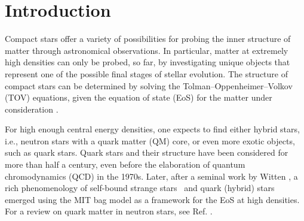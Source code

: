 \documentclass[universe,article,accept,moreauthors,pdftex]{Definitions/mdpi}
\begin{document}

\section{Introduction}
	\label{sec:introduction}

Compact stars offer a variety of possibilities for probing the inner structure of matter through astronomical observations. In particular, matter at extremely high densities can only be probed, so far, by investigating unique objects that represent one of  the possible final stages of stellar evolution. The structure of compact stars can be determined by solving the Tolman--Oppenheimer--Volkov (TOV) equations, given the equation of state (EoS) for the matter under consideration \cite{Glendenning:2000,Schaffner-Bielich:2020psc}. 

For high enough central energy densities, one expects to find either hybrid stars, i.e., neutron stars with a quark matter (QM) core, or even more exotic objects, such as quark stars. Quark stars \cite{Ivanenko:1965dg} and their structure \cite{Itoh:1970uw} have been considered for more than half a century, even before the elaboration of quantum chromodynamics (QCD) in the 1970s. Later, after a seminal work by Witten \cite{Witten:1984rs}, a rich phenomenology of self-bound strange stars~\cite{Alcock:1986hz,Haensel:1986qb} and quark (hybrid) stars emerged using the MIT bag model \cite{Farhi:1984qu} as a framework for the EoS at high densities. For a review on quark matter in neutron stars, see Ref. \cite{Buballa:2014jta}.
\end{document}
